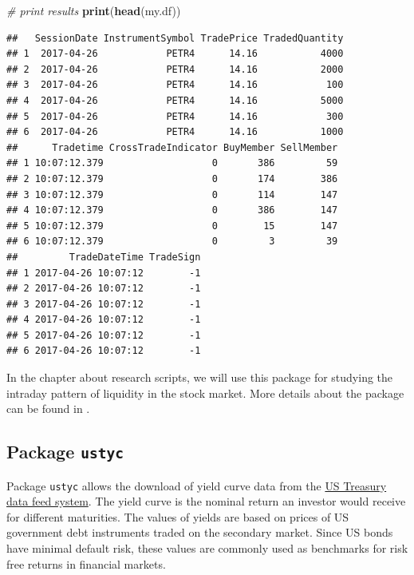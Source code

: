 \documentclass[11pt,]{book}
\newenvironment{Shaded}{\begin{snugshade}}{\end{snugshade}}
\newcommand{\KeywordTok}[1]{\textcolor[rgb]{0.27,0.27,0.27}{\textbf{#1}}}
\newcommand{\CommentTok}[1]{\textcolor[rgb]{0.56,0.35,0.01}{\textit{#1}}}
\newcommand{\NormalTok}[1]{#1}
\begin{document}
\begin{Shaded}
\begin{Highlighting}[]
\CommentTok{# print results}
\KeywordTok{print}\NormalTok{(}\KeywordTok{head}\NormalTok{(my.df))}
\end{Highlighting}
\end{Shaded}

\begin{verbatim}
##   SessionDate InstrumentSymbol TradePrice TradedQuantity
## 1  2017-04-26            PETR4      14.16           4000
## 2  2017-04-26            PETR4      14.16           2000
## 3  2017-04-26            PETR4      14.16            100
## 4  2017-04-26            PETR4      14.16           5000
## 5  2017-04-26            PETR4      14.16            300
## 6  2017-04-26            PETR4      14.16           1000
##      Tradetime CrossTradeIndicator BuyMember SellMember
## 1 10:07:12.379                   0       386         59
## 2 10:07:12.379                   0       174        386
## 3 10:07:12.379                   0       114        147
## 4 10:07:12.379                   0       386        147
## 5 10:07:12.379                   0        15        147
## 6 10:07:12.379                   0         3         39
##         TradeDateTime TradeSign
## 1 2017-04-26 10:07:12        -1
## 2 2017-04-26 10:07:12        -1
## 3 2017-04-26 10:07:12        -1
## 4 2017-04-26 10:07:12        -1
## 5 2017-04-26 10:07:12        -1
## 6 2017-04-26 10:07:12        -1
\end{verbatim}

In the chapter about research scripts, we will use this package for
studying the intraday pattern of liquidity in the stock market. More
details about the package can be found in \citet{gethfdata}.

\subsection{\texorpdfstring{Package
\texttt{ustyc}}{Package ustyc}}\label{package-ustyc}

Package \texttt{ustyc} allows the download of yield curve data from the
\href{https://www.treasury.gov/Pages/default.aspx}{US Treasury data feed
system}. The yield curve is the nominal return an investor would receive
for different maturities. The values of yields are based on prices of US
government debt instruments traded on the secondary market. Since US
bonds have minimal default risk, these values are commonly used as
benchmarks for risk free returns in financial markets. 
\end{document}
